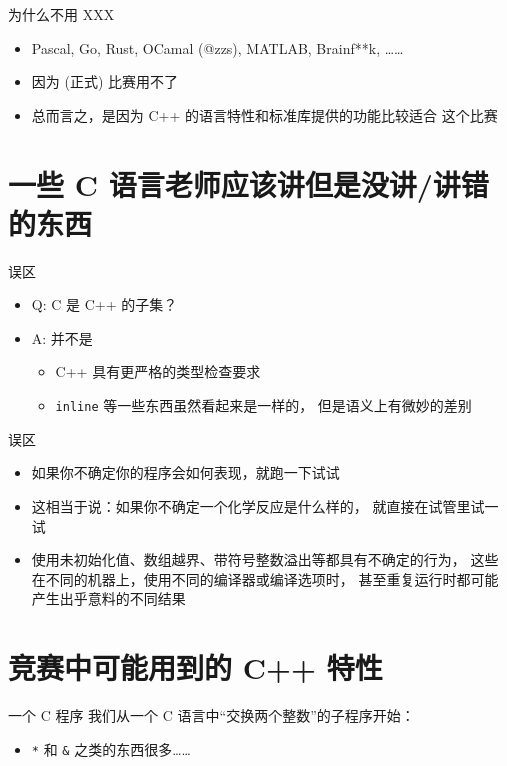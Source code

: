 \documentclass[10pt,mathserif]{beamer}
\newcommand{\lstcode}[1] {  }
\begin{document}
\begin{frame}{为什么不用 XXX}
	\begin{itemize}
		\item Pascal, Go, Rust, OCamal (@zzs), MATLAB, Brainf**k, ……
		\item 因为 (正式) 比赛用不了
		\item 总而言之，是因为 C++ 的语言特性和标准库提供的功能比较适合
			这个比赛
	\end{itemize}
\end{frame}

\section{一些 C 语言老师应该讲但是没讲/讲错的东西}
\sectionpage

\begin{frame}{误区}
	\begin{itemize}
		\item Q: C 是 C++ 的子集？
			\pause
		\item A: 并不是
			\begin{itemize}
				\item C++ 具有更严格的类型检查要求
				\item \lstinline{inline} 等一些东西虽然看起来是一样的，
					但是语义上有微妙的差别
			\end{itemize}
	\end{itemize}
\end{frame}

\begin{frame}{误区}
	\begin{itemize}
		\item 如果你不确定你的程序会如何表现，就跑一下试试
			\pause
		\item 这相当于说：如果你不确定一个化学反应是什么样的，
			就直接在试管里试一试
			\pause
		\item 使用未初始化值、数组越界、带符号整数溢出等都具有不确定的行为，
			这些在不同的机器上，使用不同的编译器或编译选项时，
			甚至重复运行时都可能产生出乎意料的不同结果
	\end{itemize}
\end{frame}

\section{竞赛中可能用到的 C++ 特性}

\begin{frame}{一个 C 程序}
	我们从一个 C 语言中“交换两个整数”的子程序开始：
	\lstcode{xchg1.c}
	\pause
	\begin{itemize}
		\item \lstinline{*} 和 \lstinline{&} 之类的东西很多……
	\end{itemize}
\end{frame}
\end{document}
